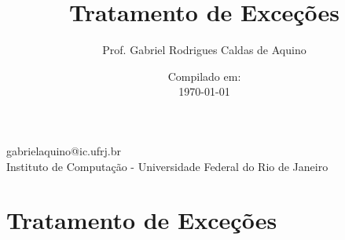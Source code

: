 
\title{Tratamento de Exceções}

\author{Prof. Gabriel Rodrigues Caldas de Aquino}

\institute
{
    gabrielaquino@ic.ufrj.br\\

    Instituto de Computação -
    Universidade Federal do Rio de Janeiro %
}
\date{Compilado em: \\ \today} %



\section{Tratamento de Exceções}

\begin{frame}
    \titlepage
\end{frame}

